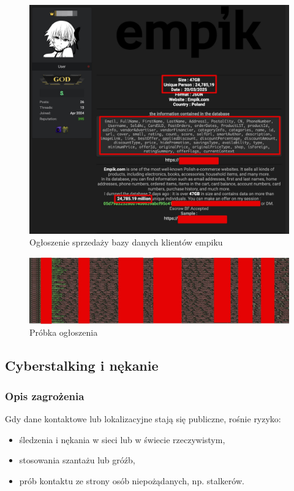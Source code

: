 \begin{figure}[H]
  \centering
  \includegraphics[width=1\textwidth]{images/empik-wyciek.jpg}
  \caption{Ogłoszenie sprzedaży bazy danych klientów empiku}
  \label{fig:empik}
\end{figure} 

\begin{figure}[H]
  \centering
  \includegraphics[width=1\textwidth]{images/probka.jpg}
  \caption{Próbka ogłoszenia}
  \label{fig:probka}
\end{figure} 

\subsection{Cyberstalking i nękanie}
\subsubsection{Opis zagrożenia}
Gdy dane kontaktowe lub lokalizacyjne stają się publiczne, rośnie ryzyko:
\begin{itemize}
\item śledzenia i nękania w sieci lub w świecie rzeczywistym,
\item stosowania szantażu lub gróźb,
\item prób kontaktu ze strony osób niepożądanych, np. stalkerów.
\end{itemize}
